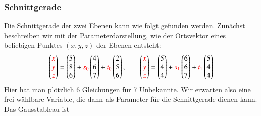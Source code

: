 \subsubsection{Schnittgerade}
Die Schnittgerade der zwei Ebenen kann wie folgt gefunden werden.
Zunächst beschreiben wir mit der Parameterdarstellung, wie der
Ortsvektor eines beliebigen Punktes $(x,y,z)$ der Ebenen entsteht:
\[
\begin{pmatrix}
\color{red}x\\
\color{red}y\\
\color{red}z\\
\end{pmatrix}
=
\begin{pmatrix}5\\8\\6\end{pmatrix}
+{\color{red}s_0}\begin{pmatrix}4\\6\\7\end{pmatrix}
+{\color{red}t_0}\begin{pmatrix}2\\5\\6\end{pmatrix}
,\qquad
\begin{pmatrix}
\color{red}x\\
\color{red}y\\
\color{red}z\\
\end{pmatrix}
=
\begin{pmatrix}5\\4\\4\end{pmatrix}
+{\color{red}s_1}\begin{pmatrix}6\\6\\7\end{pmatrix}
+{\color{red}t_1}\begin{pmatrix}5\\4\\4\end{pmatrix}
\]
Hier hat man plötzlich 6 Gleichungen für 7 Unbekannte.
Wir erwarten also eine frei wählbare Variable, die dann als Parameter
für die Schnittgerade dienen kann.
Das Gausstableau ist
